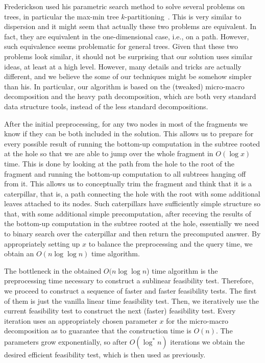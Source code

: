 \documentclass[11pt,a4paper]{article}
\theoremstyle{definition}
\theoremstyle{remark}
\begin{document}
Frederickson used his parametric search method to solve several problems on trees, in particular
the max-min tree $k$-partitioning~\cite{Frederickson1991}. This is very similar to dispersion and it might
seem that actually these two problems are equivalent. In fact, they are equivalent in the one-dimensional case,
i.e., on a path. However, such equivalence seems problematic for general trees. %
Given that these two problems look similar, it should not be surprising that our solution uses similar
ideas, at least at a high level. However, many details and tricks are actually different, and we believe
the some of our techniques might be somehow simpler than his. %
In particular, our algorithm is based on the (tweaked) micro-macro decomposition and the heavy path
decomposition, which are both very standard data structure tools, instead of the less standard
decompositions.%

After the initial preprocessing, for any two nodes in most of the fragments we know if they can be
both included in the solution. This allows us to prepare for every possible result of running the
bottom-up computation in the subtree rooted at the hole so that we are able to jump over the whole
fragment in $O(\log x)$ time. This is done by looking at the path from the hole to the root of the
fragment and running the bottom-up computation to all subtrees hanging off from it. This allows
us to conceptually trim the fragment and think that it is a caterpillar, that is, a path connecting
the hole with the root with some additional leaves attached to its nodes. Such caterpillars have
sufficiently simple structure so that, with some additional simple precomputation, after receving
the results of the bottom-up computation in the subtree rooted at the hole, essentially we need
to binary search over the caterpillar and then return the precomputed answer. By appropriately
setting up $x$ to balance the preprocessing and the query time, we obtain an $O(n\log\log n)$
time algorithm.

The bottleneck in the obtained $O(n\log\log n$) time algorithm is the preprocessing time necessary
to construct a sublinear feasibility test. Therefore, we proceed to construct a sequence of
faster and faster feasibility tests. The first of them is just the vanilla linear time feasibility test.
Then, we iteratively use the current feasibility test to construct the next (faster) feasibility test.
Every iteration uses an appropriately chosen parameter $x$ for the micro-macro decomposition
as to guarantee that the construction time is $O(n)$. The parameters grow exponentially,
so after $O(\log^{*}n)$ iterations we obtain the desired efficient feasibility test, which is then
used as previously.
\end{document}
